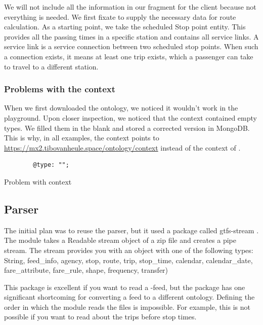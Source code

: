 We will not include all the information in our fragment for the client because not everything is needed. We first fixate to supply the necessary data for route calculation. As a starting point, we take the scheduled Stop point entity. This provides all the passing times in a specific station and contains all service links. A service link is a service connection between two scheduled stop points. When such a connection exists, it means at least one trip exists, which a passenger can take to travel to a different station.



\subsubsection{Problems with the   context}
When we first downloaded the ontology, we noticed it wouldn't work in the  playground. Upon closer inspection, we noticed that the context contained empty types. We filled them in the blank and stored a corrected version in MongoDB. This is why, in all examples, the context points to \url{https://mx2.tibovanheule.space/ontology/context} instead of the context of .
\begin{listing}[H]
    \begin{verbatim}
        @type: "";
    \end{verbatim}
    \caption{Problem with  context}
    \label{code:context:problem}
\end{listing}

\subsection{Parser}
The initial plan was to reuse the parser, but it used a package called gtfs-stream \cite{noauthor_staecogtfs-stream_2024}. The module takes a Readable stream object of a  zip file and creates a pipe stream. The stream provides you  with an object with one of the following types: String, feed\_info, agency, stop, route, trip, stop\_time, calendar, calendar\_date, fare\_attribute, fare\_rule, shape, frequency, transfer)

This package is excellent if you want to read a -feed, but the package has one significant shortcoming for converting a feed to a different ontology. Defining the order in which the module reads the files is impossible. For example, this is not possible if you want to read about the trips before stop times.

